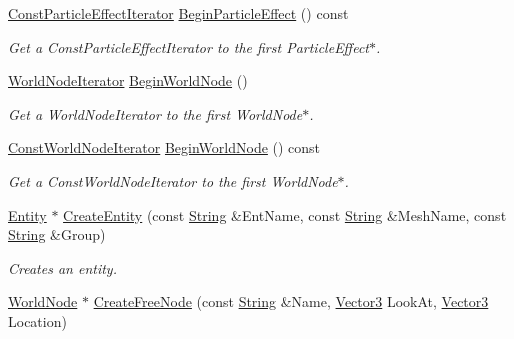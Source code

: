 \begin{DoxyCompactItemize}
\hyperlink{classMezzanine_1_1SceneManager_aa99ab0f491a991bda63127519b40b04f}{ConstParticleEffectIterator} \hyperlink{classMezzanine_1_1SceneManager_ac9e454fc20bdb1e1f118754994ff39e0}{BeginParticleEffect} () const 
\begin{DoxyCompactList}\small\item\em Get a ConstParticleEffectIterator to the first ParticleEffect$\ast$. \item\end{DoxyCompactList}\item 
\hyperlink{classMezzanine_1_1SceneManager_aa58ecf1d7d283a576509b71133064a27}{WorldNodeIterator} \hyperlink{classMezzanine_1_1SceneManager_a6b3844dcb5e3e4df4e50b47fb6158960}{BeginWorldNode} ()
\begin{DoxyCompactList}\small\item\em Get a WorldNodeIterator to the first WorldNode$\ast$. \item\end{DoxyCompactList}\item 
\hyperlink{classMezzanine_1_1SceneManager_a39bddd192e396e2e7cf92bca33b4d03c}{ConstWorldNodeIterator} \hyperlink{classMezzanine_1_1SceneManager_a0d374c51309d155a1e49fd033e863111}{BeginWorldNode} () const 
\begin{DoxyCompactList}\small\item\em Get a ConstWorldNodeIterator to the first WorldNode$\ast$. \item\end{DoxyCompactList}\item 
\hyperlink{classMezzanine_1_1Entity}{Entity} $\ast$ \hyperlink{classMezzanine_1_1SceneManager_a3bb0d7b70e9a01090602c9caa005325a}{CreateEntity} (const \hyperlink{namespaceMezzanine_acf9fcc130e6ebf08e3d8491aebcf1c86}{String} \&EntName, const \hyperlink{namespaceMezzanine_acf9fcc130e6ebf08e3d8491aebcf1c86}{String} \&MeshName, const \hyperlink{namespaceMezzanine_acf9fcc130e6ebf08e3d8491aebcf1c86}{String} \&Group)
\begin{DoxyCompactList}\small\item\em Creates an entity. \item\end{DoxyCompactList}\item 
\hyperlink{classMezzanine_1_1WorldNode}{WorldNode} $\ast$ \hyperlink{classMezzanine_1_1SceneManager_a7d200b747b15bba75833244a0bc8c25a}{CreateFreeNode} (const \hyperlink{namespaceMezzanine_acf9fcc130e6ebf08e3d8491aebcf1c86}{String} \&Name, \hyperlink{classMezzanine_1_1Vector3}{Vector3} LookAt, \hyperlink{classMezzanine_1_1Vector3}{Vector3} Location)

\end{DoxyCompactItemize}
